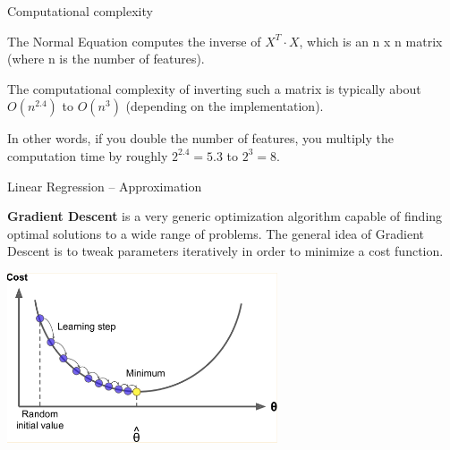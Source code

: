 \documentclass{beamer}
\begin{document}






\begin{frame}
{\centerline{Computational complexity}}

The Normal Equation computes the inverse of $X^T \cdot X$, which is an n x n matrix (where n is the number of features). 
\newline

The computational complexity of inverting such a matrix is typically about $O( n^{2.4})$ to $O( n^3)$ (depending on the implementation). 
\newline

In other words, if you double the number of features, you multiply the computation time by roughly $2^{2.4} = 5.3$ to $2^3 = 8$.

\end{frame}


\begin{frame}
{\centerline{Linear Regression -- Approximation}}

\textbf{Gradient Descent} is a very generic optimization algorithm capable of finding optimal solutions to a wide range of problems. The general idea of Gradient Descent is to tweak parameters iteratively in order to minimize a cost function.

\begin{center}
\includegraphics[width=8cm]{A2022.IDSEPC.RegressioneLineare/gd-1.png}
\end{center}


\end{frame}
\end{document}
